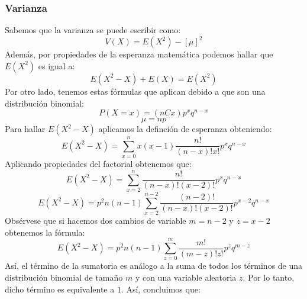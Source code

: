 \documentclass[12pt]{article}
\begin{document}
            \subsubsection{Varianza}
              Sabemos que la varianza se puede escribir como:
              \begin{equation*}
              V(X)=E({ X }^{ 2 })-{ \left[ \mu \right]  }^{ 2 }
              \end{equation*}
              Además, por propiedades de la esperanza matemática podemos hallar que $E({X}^{2})$ es igual a:
              \begin{equation*}
              E({ X }^{ 2 }-X)+E(X)=E({ X }^{ 2 })
              \end{equation*}
              Por otro lado, tenemos estas fórmulas que aplican debido a que son una distribución binomial:
              \begin{equation*}
              P(X=x)= (nCx){ p }^{ x }{ q }^{ n-x }
              \end{equation*}
              \begin{equation*}
              \mu =np
              \end{equation*}
              Para hallar $E({ X }^{ 2 }-X)$ aplicamos la definción de esperanza obteniendo:
              \begin{equation*}
              E({ X }^{ 2 }-X)=\sum _{ x=0 }^{ n }{ x(x-1)\frac { n! }{ (n-x)!x! } { p }^{ x }{ q }^{ n-x } }
              \end{equation*}
              Aplicando propiedades del factorial obtenemos que:
              \begin{equation*}
              E({ X }^{ 2 }-X)=\sum _{ x=2 }^{ n }{ \frac { n! }{ (n-x)!(x-2)! } { p }^{ x }{ q }^{ n-x } }
              \end{equation*}
              \begin{equation*}
               E({ X }^{ 2 }-X)={ p }^{ 2 }n(n-1)\sum _{ x=2 }^{ n-2 }{ \frac { (n-2)! }{ (n-x)!(x-2)! } { p }^{ x-2 }{ q }^{ n-x } } 
              \end{equation*}
              Obsérvese que si hacemos dos cambios de variable $m =n-2$ y $z=x-2$ obtenemos la fórmula:
              \begin{equation*}
              E({ X }^{ 2 }-X)={ p }^{ 2 }n(n-1)\sum _{ z=0 }^{ m }{ \frac { m! }{ (m-z)!z! } { p }^{ z }{ q }^{ m-z } } 
              \end{equation*}
              Así, el término de la sumatoria es análogo a la suma de todos los términos de una distribución binomial de tamaño $m$ y con una variable aleatoria $z$. Por lo tanto, dicho término es equivalente a $1$. Así, concluimos que:
\end{document}

